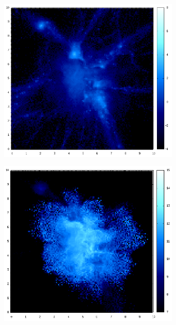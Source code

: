 \documentclass[journal]{IEEEtran}
\begin{document}
\begin{figure}[h!]
\begin{subfigure}[t]{0.25\textwidth}
	\end{subfigure}
	\quad
	\begin{subfigure}[t]{0.25\textwidth}
		\centering
		\includegraphics[width=\linewidth]{GAS03-04.png}
	\end{subfigure}
	\quad
	\begin{subfigure}[t]{0.25\textwidth}
		\centering
		\includegraphics[width=\linewidth]{TEMP03-04.png}

\end{subfigure}
\end{figure}
\end{document}
